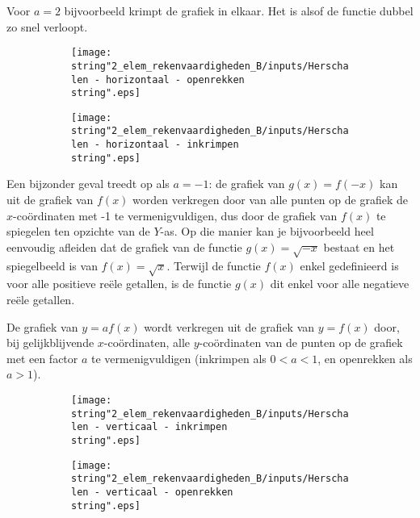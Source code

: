 \noindent Voor $a=2$ bijvoorbeeld krimpt de grafiek in elkaar. Het
is alsof de functie dubbel zo snel verloopt.

\begin{figure}[h]
\begin{subfigure}{.5\linewidth}
\texttt{[image: \\string"2\_elem\_rekenvaardigheden\_B/inputs/Herschalen - horizontaal - openrekken\\string".eps]}
\end{subfigure}
\begin{subfigure}{.5\linewidth}
\texttt{[image: \\string"2\_elem\_rekenvaardigheden\_B/inputs/Herschalen - horizontaal - inkrimpen\\string".eps]}
\end{subfigure}	
\end{figure}

\noindent Een bijzonder geval treedt op als $a=-1$: de grafiek van
$g(x)=f(-x)$ kan uit de grafiek van $f(x)$ worden verkregen door
van alle punten op de grafiek de $x$-co\"ordinaten met -1 te vermenigvuldigen,
dus door de grafiek van $f(x)$ te spiegelen ten opzichte van de $Y$-as.
Op die manier kan je bijvoorbeeld heel eenvoudig afleiden dat de grafiek
van de functie $g(x)=\sqrt{-x}$ bestaat en het spiegelbeeld is van
$f(x)=\sqrt{x}$. Terwijl de functie $f(x)$ enkel gedefinieerd is
voor alle positieve re\"ele getallen, is de functie $g(x)$ dit enkel
voor alle negatieve re\"ele getallen.


\noindent De grafiek van $y=af(x)$ wordt verkregen uit de grafiek
van $y=f(x)$ door, bij gelijkblijvende $x$-co\"ordinaten, alle $y$-co\"ordinaten
van de punten op de grafiek met een factor $a$ te vermenigvuldigen
(inkrimpen als $0<a<1$, en openrekken als $a>1$).


\begin{figure}[h]
	\begin{subfigure}{.5\linewidth}
	\texttt{[image: \\string"2\_elem\_rekenvaardigheden\_B/inputs/Herschalen - verticaal - inkrimpen\\string".eps]}
	\end{subfigure}
	\begin{subfigure}{.5\linewidth}
	\texttt{[image: \\string"2\_elem\_rekenvaardigheden\_B/inputs/Herschalen - verticaal - openrekken\\string".eps]}
	\end{subfigure}	
\end{figure}


